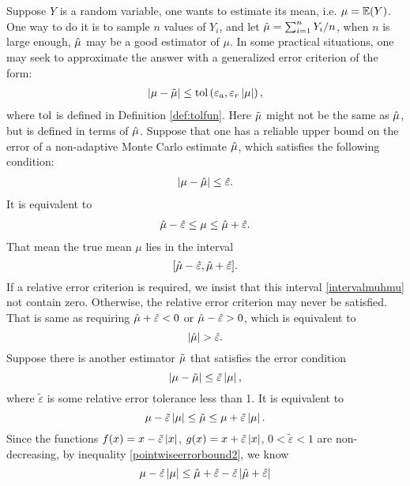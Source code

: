 \documentclass{iitthesis}
\theoremstyle{definition}
\begin{document}
 Suppose $Y$ is a random variable, one wants to estimate its mean, i.e. $\mu=\mathbb{E}(Y)$. One way to do it is to sample $n$ values of $Y_i$, and let $\hat{\mu}=\sum_{i=1}^n Y_i/n$, when $n$ is large enough, $\hat{\mu}$ may be a good estimator of $\mu$. In some practical situations, one may seek to approximate the answer with a generalized error criterion of the form:
\begin{align}\left \lvert \mu -\tilde{\mu} \right \rvert \leq \operatorname{tol} \left(\varepsilon_a,\varepsilon_r \left \lvert \mu \right \rvert\right),\label{pointwisegeneralizederror} 
\end{align}
where $\operatorname{tol}$ is defined in Definition \ref{def:tolfun}. Here $\tilde{\mu}$ might not be the same as $\hat{\mu}$, but is defined in terms of $\hat{\mu}$. Suppose that one has a reliable upper bound on the error of a non-adaptive Monte Carlo estimate $\hat{\mu}$, which satisfies the following condition:
\begin{align}
|\mu-\hat{\mu}| \leq \hat{\varepsilon}.  \label{pointwiseerrorbound} 
\end{align}
It is equivalent to 
\begin{align}
\hat{\mu} -\hat{\varepsilon} \leq \mu \leq \hat{\mu}+\hat{\varepsilon}.  \label{pointwiseerrorbound2} 
\end{align}
That mean the true mean $\mu$ lies in the interval 
\begin{equation}\label{intervalmuhmu}
[\hat{\mu} -\hat{\varepsilon}, \hat{\mu} +\hat{\varepsilon} ].
\end{equation}
If a relative error criterion is required, we insist that this interval \eqref{intervalmuhmu} not contain zero. Otherwise, the relative error criterion may never be satisfied. That is same as requiring
$\hat{\mu} +\hat{\varepsilon}<0$ or $\hat{\mu} -\hat{\varepsilon}>0$, which is equivalent to  
\begin{equation} \label{hmuhepscondition}
\left \lvert \hat{\mu} \right \rvert > \hat{\varepsilon}.
\end{equation}
Suppose there is another estimator $\tilde{\mu}$ that satisfies the error condition
\begin{equation}\label{reltmu}
\left \lvert \mu-\tilde{\mu} \right \rvert \leq \tilde{\varepsilon}\left \lvert \mu \right \rvert,
\end{equation}
where $\tilde{\varepsilon}$ is some relative error tolerance less than 1.
It is equivalent to 
\begin{equation}
 \mu-\tilde{\varepsilon}\left \lvert \mu \right \rvert \leq \tilde{\mu} \leq \mu+\tilde{\varepsilon}\left \lvert \mu \right \rvert.
\end{equation}
Since the functions
$f(x) = x-\tilde{\varepsilon}\left \lvert x \right \rvert$, $g(x) = x+\tilde{\varepsilon}\left \lvert x \right \rvert$, $0<\tilde{\varepsilon} <1$ are non-decreasing, by inequality \eqref{pointwiseerrorbound2}, we know
$$\mu-\tilde{\varepsilon}\left \lvert \mu \right \rvert \leq \hat{\mu}+\hat{\varepsilon}-\tilde{\varepsilon}\left \lvert \hat{\mu}+\hat{\varepsilon} \right \rvert$$
\end{document}
